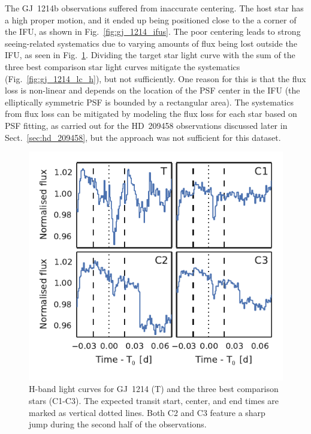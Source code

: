 \documentclass[useAMS,usenatbib]{mn2e}
\begin{document}
The GJ~1214b observations suffered from inaccurate centering. The host star has a high proper motion, and it ended up 
being positioned close to the a corner of the IFU, as shown in Fig.~\ref{fig:gj_1214_ifus}.
The poor centering leads to strong seeing-related systematics due to varying amounts of flux being lost outside the 
IFU, as seen in Fig.~\ref{fig:gj_1214_h_raw_lcs}. Dividing the target star light curve with the sum of the three best 
comparison star light curves mitigate the systematics (Fig.~\ref{fig:gj_1214_lc_h}), but not sufficiently. One reason 
for this is that the flux loss is non-linear and depends on the location of the PSF center in the IFU (the 
elliptically symmetric PSF is bounded by a rectangular area). The systematics from flux loss can be mitigated by 
modeling the flux loss for each star based on PSF fitting, as carried out for the HD~209458 observations discussed 
later in Sect.~\ref{sec:hd_209458}, but the approach was not sufficient for this dataset.

\begin{figure}
 \centering
 \includegraphics[width=\columnwidth]{gj_1214_h_raw_lcs.pdf}
 \caption{H-band light curves for GJ~1214 (T) and the three best comparison stars (C1-C3). The expected 
transit start, center, and end times are marked as vertical dotted lines. Both C2 and C3 feature a sharp jump during 
the 
second half of the observations.}
 \label{fig:gj_1214_h_raw_lcs}
\end{figure}
\end{document}
